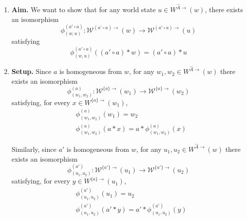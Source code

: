\begin{proofE}
\begin{enumerate}[(1)]
    \item \textbf{Aim.}
    We want to show that for any world state $u \in W^{\hat{A}\to}(w)$, there exists an isomorphism
    \begin{equation}
        \phi^{(a' \circ a)}_{(w,u)} : \mathscr{W}^{(a' \circ a)\to}(w) \to \mathscr{W}^{(a' \circ a)\to}(u)
    \end{equation}
    satisfying
    \begin{equation}
        \phi^{(a' \circ a)}_{(w,u)} ( (a' \circ a) \ast w) = (a' \circ a) \ast u
    \end{equation}

    \item \textbf{Setup.}
    Since $a$ is homogeneous from $w$, for any $w_{1}, w_{2} \in W^{\hat{A}\to}(w)$ there exists an isomorphism
    \begin{equation}
        \phi_{(w_{1}, w_{2})}^{(a)}: \mathscr{W}^{\{a\}\to}(w_{1}) \to \mathscr{W}^{\{a\}\to}(w_{2})
    \end{equation}
    satisfying, for every $x \in W^{\{a\}\to}(w_{1})$,
    \begin{align}
        & \phi_{(w_{1}, w_{2})}^{(a)}(w_{1}) = w_{2} \\
        & \phi_{(w_{1}, w_{2})}^{(a)}(a \ast x) = a \ast \phi_{(w_{1}, w_{2})}^{(a)}(x)
    \end{align}

    Similarly, since $a'$ is homogeneous from $w$, for any $u_{1}, u_{2} \in W^{\hat{A}\to}(w)$ there exists an isomorphism
    \begin{equation}
        \phi_{(u_{1}, u_{2})}^{(a')}: \mathscr{W}^{\{a'\}\to}(u_{1}) \to \mathscr{W}^{\{a'\}\to}(u_{2})
    \end{equation}
    satisfying, for every $y \in W^{\{a\}\to}(u_{1})$,
    \begin{align}
        & \phi_{(u_{1}, u_{2})}^{(a')}(u_{1}) = u_{2} \\
        & \phi_{(u_{1}, u_{2})}^{(a')}(a' \ast y) = a' \ast \phi_{(u_{1}, u_{2})}^{(a')}(y)
    \end{align}


\end{enumerate}
\end{proofE}
